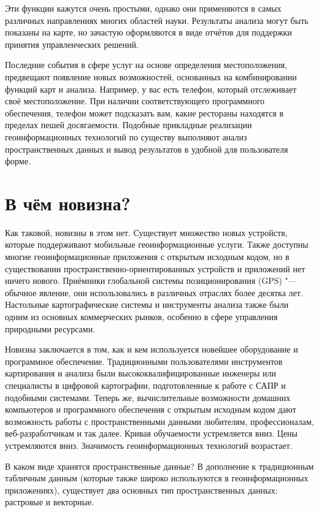 Эти функции кажутся очень простыми, однако они применяются в самых
различных направлениях многих областей науки. Результаты анализа могут
быть показаны на карте, но зачастую оформляются в виде отчётов для
поддержки принятия управленческих решений.

Последние события в сфере услуг на основе определения местоположения,
предвещают появление новых возможностей, основанных на комбинировании
функций карт и анализа. Например, у вас есть телефон, который
отслеживает своё местоположение. При наличии соответствующего
программного обеспечения, телефон может подсказать вам, какие
рестораны находятся в пределах пешей досягаемости. Подобные
прикладные реализации геоинформационных технологий по существу выполняют
анализ пространственных данных и вывод результатов в удобной для пользователя
форме.

\section{В чём новизна?}\label{label_whynew}

Как таковой, новизны в этом нет. Существует множество новых устройств, которые
поддерживают мобильные геоинформационные услуги. Также доступны многие
геоинформационные приложения с открытым исходным кодом, но в
существовании пространственно-ориентированных устройств и приложений нет
ничего нового. Приёмники глобальной системы позиционирования (GPS) "--- обычное
явление, они использовались в различных отраслях более десятка лет.
Настольные картографические системы и инструменты анализа также были одним из
основных коммерческих рынков, особенно в сфере управления природными ресурсами.

Новизна заключается в том, как и кем используется новейшее оборудование и
программное обеспечение. Традиционными пользователями инструментов
картирования и анализа были высококвалифицированные инженеры или
специалисты в цифровой картографии, подготовленные к работе с
САПР и подобными системами. Теперь же, вычислительные возможности
домашних компьютеров и программного обеспечения с открытым исходным
кодом дают возможность работы с пространственными данными любителям, профессионалам,
веб-разработчикам и так далее. Кривая обучаемости устремляется вниз. Цены устремляются вниз. Значимость геоинформационных технологий возрастает.

В каком виде хранятся пространственные данные? В дополнение к традиционным
табличным данным (которые также широко используются в геоинформационных
приложениях), существует два основных тип пространственных данных: растровые и
векторные.

